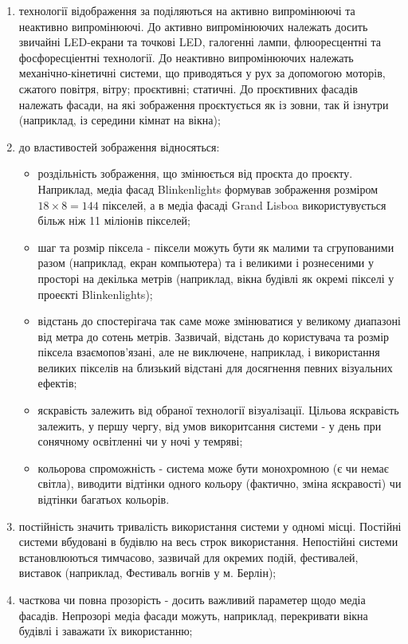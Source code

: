\documentclass[a4paper,ukrainian,utf8,nocolumnsxix,floatsection,equationsection]{eskdtext}
\begin{document}
\begin{enumerate}
	\item технології відображення за  поділяються на активно випромінюючі та неактивно випромінюючі. До активно випромінюючих належать досить звичайні LED-екрани та точкові LED, галогенні лампи, флюоресцентні та фосфоресціентні технології. До неактивно випромінюючих належать механічно-кінетичні системи, що приводяться у рух за допомогою моторів, сжатого повітря, вітру; проєктивні; статичні. До проєктивних фасадів належать фасади, на які зображення проєктується як із зовни, так й ізнутри (наприклад, із середини кімнат на вікна);
	\item до властивостей зображення відносяться:
		\begin{itemize}
			\item роздільність зображення, що змінюється від проєкта до проєкту. Наприклад, медіа фасад Blinkenlights формував зображення розміром $18\times8=144$ пікселей, а в медіа фасаді Grand Lisboa використувується більж ніж 11 міліонів пікселей;
			\item шаг та розмір піксела - піксели можуть бути як малими та сгрупованими разом (наприклад, екран компьютера) та і великими і рознесеними у просторі на декілька метрів (наприклад, вікна будівлі як окремі пікселі у проеєкті Blinkenlights);
			\item відстань до спостерігача так саме може змінюватися у великому диапазоні від метра до сотень метрів. Зазвичай, відстань до користувача та розмір піксела взаємопов’язані, але не виключене, наприклад, і використання великих пікселів на близький відстані для досягнення певних візуальних ефектів;
			\item яскравість залежить від обраної технології візуалізації. Цільова яскравість залежить, у першу чергу, від умов викоритсання системи - у день при сонячному освітленні чи у ночі у темряві;
			\item кольорова спроможність - система може бути монохромною (є чи немає світла), виводити відтінки одного кольору (фактично, зміна яскравості) чи відтінки багатьох кольорів.
		\end{itemize}
	\item постійність значить тривалість використання системи у одномі місці. Постійні системи вбудовані в будівлю на весь строк використання. Непостійні системи встановлюються тимчасово, зазвичай для окремих подій, фестивалей, виставок (наприклад, Фестиваль вогнів у м. Берлін);
	\item часткова чи повна прозорість - досить важливий параметер щодо медіа фасадів. Непрозорі медіа фасади можуть, наприклад, перекривати вікна будівлі і заважати їх використанню;

\end{enumerate}
\end{document}
